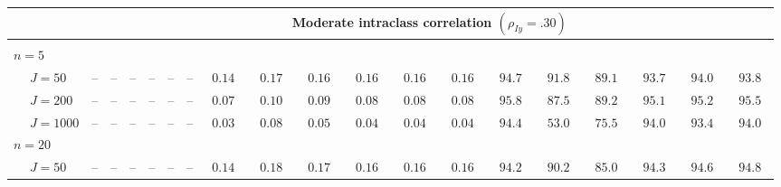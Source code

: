 \begin{sidewaystable}
\begin{threeparttable}
\begin{tabular}{llcccccccccccccccccc}
& & \multicolumn{18}{c}{Moderate intraclass correlation $(\rho_{Iy}=.30)$} \\[0.6ex]\hline\\[-1.8ex]
\multicolumn{4}{l}{$n=5$} \\  & \nopagebreak $\;J=50$  & \phantom{00}--\phantom{00} & \phantom{00}--\phantom{00} & \phantom{00}--\phantom{00} & \phantom{00}--\phantom{00} & \phantom{00}--\phantom{00} & \phantom{00}--\phantom{00} & $\phantom{0}0.14\phantom{0}$ & $\phantom{0}0.17\phantom{0}$ & $\phantom{0}0.16\phantom{0}$ & $\phantom{0}0.16\phantom{0}$ & $\phantom{0}0.16\phantom{0}$ & $\phantom{0}0.16\phantom{0}$ & $\phantom{0}94.7\phantom{0}$ & $\phantom{0}91.8\phantom{0}$ & $\phantom{0}89.1\phantom{0}$ & $\phantom{0}93.7\phantom{0}$ & $\phantom{0}94.0\phantom{0}$ & $\phantom{0}93.8\phantom{0}$ \\
 & \nopagebreak $\;J=200$  & \phantom{00}--\phantom{00} & \phantom{00}--\phantom{00} & \phantom{00}--\phantom{00} & \phantom{00}--\phantom{00} & \phantom{00}--\phantom{00} & \phantom{00}--\phantom{00} & $\phantom{0}0.07\phantom{0}$ & $\phantom{0}0.10\phantom{0}$ & $\phantom{0}0.09\phantom{0}$ & $\phantom{0}0.08\phantom{0}$ & $\phantom{0}0.08\phantom{0}$ & $\phantom{0}0.08\phantom{0}$ & $\phantom{0}95.8\phantom{0}$ & $\phantom{0}87.5\phantom{0}$ & $\phantom{0}89.2\phantom{0}$ & $\phantom{0}95.1\phantom{0}$ & $\phantom{0}95.2\phantom{0}$ & $\phantom{0}95.5\phantom{0}$ \\
 & \nopagebreak $\;J=1000$  & \phantom{00}--\phantom{00} & \phantom{00}--\phantom{00} & \phantom{00}--\phantom{00} & \phantom{00}--\phantom{00} & \phantom{00}--\phantom{00} & \phantom{00}--\phantom{00} & $\phantom{0}0.03\phantom{0}$ & $\phantom{0}0.08\phantom{0}$ & $\phantom{0}0.05\phantom{0}$ & $\phantom{0}0.04\phantom{0}$ & $\phantom{0}0.04\phantom{0}$ & $\phantom{0}0.04\phantom{0}$ & $\phantom{0}94.4\phantom{0}$ & $\phantom{0}53.0\phantom{0}$ & $\phantom{0}75.5\phantom{0}$ & $\phantom{0}94.0\phantom{0}$ & $\phantom{0}93.4\phantom{0}$ & $\phantom{0}94.0\phantom{0}$ \\
\multicolumn{4}{l}{$n=20$} \\  & \nopagebreak $\;J=50$  & \phantom{00}--\phantom{00} & \phantom{00}--\phantom{00} & \phantom{00}--\phantom{00} & \phantom{00}--\phantom{00} & \phantom{00}--\phantom{00} & \phantom{00}--\phantom{00} & $\phantom{0}0.14\phantom{0}$ & $\phantom{0}0.18\phantom{0}$ & $\phantom{0}0.17\phantom{0}$ & $\phantom{0}0.16\phantom{0}$ & $\phantom{0}0.16\phantom{0}$ & $\phantom{0}0.16\phantom{0}$ & $\phantom{0}94.2\phantom{0}$ & $\phantom{0}90.2\phantom{0}$ & $\phantom{0}85.0\phantom{0}$ & $\phantom{0}94.3\phantom{0}$ & $\phantom{0}94.6\phantom{0}$ & $\phantom{0}94.8\phantom{0}$ \\

\end{tabular}
\end{threeparttable}
\end{sidewaystable}
